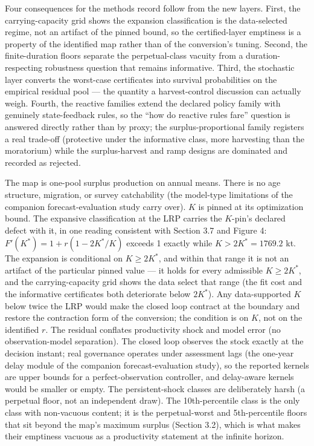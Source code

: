 \documentclass[11pt]{article}
\begin{document}
Four consequences for the methods record follow from the new layers.
First, the carrying-capacity grid shows the expansion classification is
the data-selected regime, not an artifact of the pinned bound, so the
certified-layer emptiness is a property of the identified map rather
than of the conversion's tuning. Second, the finite-duration floors
separate the perpetual-class vacuity from a duration-respecting
robustness question that remains informative. Third, the stochastic
layer converts the worst-case certificates into survival probabilities
on the empirical residual pool --- the quantity a harvest-control
discussion can actually weigh. Fourth, the reactive families extend the
declared policy family with genuinely state-feedback rules, so the ``how
do reactive rules fare'' question is answered directly rather than by
proxy; the surplus-proportional family registers a real trade-off
(protective under the informative class, more harvesting than the
moratorium) while the surplus-harvest and ramp designs are dominated and
recorded as rejected.

The map is one-pool surplus production on annual means. There is no age
structure, migration, or survey catchability (the model-type limitations
of the companion forecast-evaluation study carry over). \(K\) is pinned
at its optimization bound. The expansive classification at the LRP
carries the \(K\)-pin's declared defect with it, in one reading
consistent with Section 3.7 and Figure 4:
\(F'(K^*) = 1 + r(1 - 2K^*/K)\) exceeds 1 exactly while
\(K > 2K^* = 1769.2\) kt. The expansion is conditional on
\(K \ge 2K^*\), and within that range it is not an artifact of the
particular pinned value --- it holds for every admissible
\(K \ge 2K^*\), and the carrying-capacity grid shows the data select
that range (the fit cost and the informative certificates both
deteriorate below \(2K^*\)). Any data-supported \(K\) below twice the
LRP would make the closed loop contract at the boundary and restore the
contraction form of the conversion; the condition is on \(K\), not on
the identified \(r\). The residual conflates productivity shock and
model error (no observation-model separation). The closed loop observes
the stock exactly at the decision instant; real governance operates
under assessment lags (the one-year delay module of the companion
forecast-evaluation study), so the reported kernels are upper bounds for
a perfect-observation controller, and delay-aware kernels would be
smaller or empty. The persistent-shock classes are deliberately harsh (a
perpetual floor, not an independent draw). The 10th-percentile class is
the only class with non-vacuous content; it is the perpetual-worst and
5th-percentile floors that sit beyond the map's maximum surplus
(Section 3.2), which is what makes their emptiness vacuous as a
productivity statement at the infinite horizon.
\end{document}
